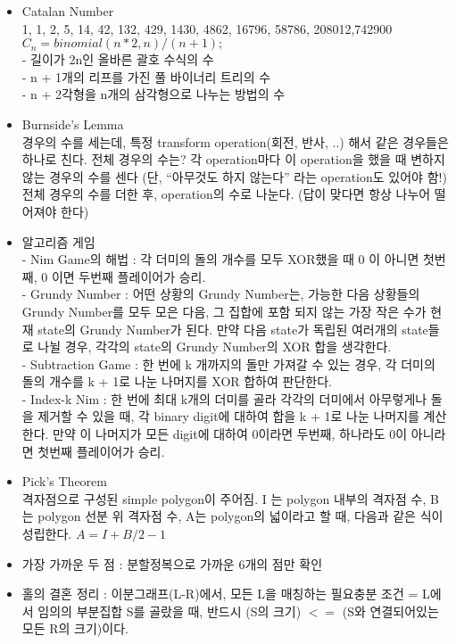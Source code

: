 \documentclass[landscape, 10pt, a4paper, oneside, twocolumn]{extarticle}
\begin{document}
\begin{itemize}
    \item Catalan Number\\
          1, 1, 2, 5, 14, 42, 132, 429, 1430, 4862, 16796, 58786, 208012,742900\\
          $C_n = binomial(n * 2, n) / (n + 1);$\\
          - 길이가 2n인 올바른 괄호 수식의 수\\
          - n + 1개의 리프를 가진 풀 바이너리 트리의 수\\
          - n + 2각형을 n개의 삼각형으로 나누는 방법의 수
    \item Burnside’s Lemma\\
          경우의 수를 세는데, 특정 transform operation(회전, 반사, ..) 해서 같은 경우들은 하나로 친다. 전체 경우의 수는? 각 operation마다 이 operation을 했을 때 변하지 않는 경우의 수를 센다 (단, “아무것도 하지 않는다” 라는 operation도 있어야 함!) 전체 경우의 수를 더한 후, operation의 수로 나눈다. (답이 맞다면 항상 나누어 떨어져야 한다)
    \item 알고리즘 게임\\
          - Nim Game의 해법 : 각 더미의 돌의 개수를 모두 XOR했을 때 0 이 아니면 첫번째, 0 이면 두번째 플레이어가 승리.\\
          - Grundy Number : 어떤 상황의 Grundy Number는, 가능한 다음 상황들의 Grundy Number를 모두 모은 다음, 그 집합에 포함 되지 않는 가장 작은 수가 현재 state의 Grundy Number가 된다. 만약 다음 state가 독립된 여러개의 state들로 나뉠 경우, 각각의 state의 Grundy Number의 XOR 합을 생각한다.\\
          - Subtraction Game : 한 번에 k 개까지의 돌만 가져갈 수 있는 경우, 각 더미의 돌의 개수를 k + 1로 나눈 나머지를 XOR 합하여 판단한다.\\
          - Index-k Nim : 한 번에 최대 k개의 더미를 골라 각각의 더미에서 아무렇게나 돌을 제거할 수 있을 때, 각 binary digit에 대하여 합을 k + 1로 나눈 나머지를 계산한다. 만약 이 나머지가 모든 digit에 대하여 0이라면 두번째, 하나라도 0이 아니라면 첫번째 플레이어가 승리.
    \item Pick’s Theorem\\
          격자점으로 구성된 simple polygon이 주어짐. I 는 polygon 내부의 격자점 수, B 는 polygon 선분 위 격자점 수, A는 polygon의 넓이라고 할 때, 다음과 같은 식이 성립한다. $A=I+B/2-1$
    \item 가장 가까운 두 점 : 분할정복으로 가까운 6개의 점만 확인
    \item 홀의 결혼 정리 : 이분그래프(L-R)에서, 모든 L을 매칭하는 필요충분 조건 = L에서 임의의 부분집합 S를 골랐을 때, 반드시 (S의 크기) $<=$ (S와 연결되어있는 모든 R의 크기)이다.

\end{itemize}
\end{document}
